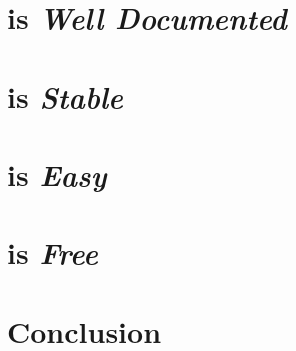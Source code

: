 \documentclass[letterpaper]{article}
\begin{document}
    

    \section*{\LaTeXe{} is \textit{Well Documented}}

    

    \section*{\LaTeXe{} is \textit{Stable}}

    

    \section*{\LaTeXe{} is \textit{Easy}}

    

    \section*{\LaTeXe{} is \textit{Free}}

    

    \section{Conclusion}
    \label{Conclusion}

    \appendix{}
    


    \theendnotes{}

        
    
    \nocite{*}

    \printindex{}
\end{document}
